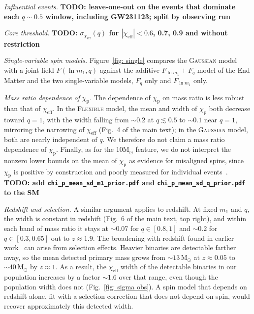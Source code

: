 \documentclass[%
 onecolumn,
 amsmath,amssymb,
 aps,
 prl,
 nofootinbib,nobibnotes,
]{revtex4-2}
\newcommand{\Msun}{\ensuremath{\mathrm{M}_{\odot}}}
\newcommand{\chieff}{\ensuremath{\chi_{\mathrm{eff}}}}
\newcommand{\chip}{\ensuremath{\chi_{\mathrm{p}}}}
\newcommand{\red}[1]{{\color{Red} #1}}
\newcommand{\todo}[1]{{\color{Blue}\bf TODO: #1}}
\newcommand{\flexiblespins}{\textsc{Flexible}\xspace}
\newcommand{\gaussianspins}{\textsc{Gaussian}\xspace}
\newcommand{\featTen}{10\xspace}
\begin{document}
\textit{Influential events.} \todo{leave-one-out on the events that dominate each $q \sim 0.5$ window, including GW231123; split by observing run}

\textit{Core threshold.} \todo{$\sigma_{\chieff}(q)$ for $|\chieff| < 0.6$, 0.7, 0.9 and without restriction}

\textit{Single-variable spin models.} Figure~\ref{fig: single} compares the \gaussianspins model with a joint field $F(\ln m_1, q)$ against the additive $F_{\ln m_1} + F_q$ model of the End Matter and the two single-variable models, $F_q$ only and $F_{\ln m_1}$ only.

\textit{Mass ratio dependence of} $\chip$\textit{.} The dependence of $\chip$ on mass ratio is less robust than that of $\chieff$. In the \flexiblespins model, the mean and width of $\chip$ both decrease toward $q = 1$, with the width falling from $\sim 0.2$ at $q \lesssim 0.5$ to $\sim 0.1$ near $q = 1$, mirroring the narrowing of $\chieff$ (Fig.~4 of the main text); in the \gaussianspins model, both are nearly independent of $q$. We therefore do not claim a mass ratio dependence of $\chip$. Finally, as for the \featTen $\Msun$ feature, we do not interpret the nonzero lower bounds on the mean of $\chip$ as evidence for misaligned spins, since $\chip$ is positive by construction and poorly measured for individual events~\cite{Vitale:2022dpa, Miller:2024sui}. \todo{add \texttt{chi\_p\_mean\_sd\_m1\_prior.pdf} and \texttt{chi\_p\_mean\_sd\_q\_prior.pdf} to the SM}

\textit{Redshift and selection.} A similar argument applies to redshift. At fixed $m_1$ and $q$, the width is constant in redshift (Fig.~6 of the main text, top right), and within each band of mass ratio it stays at $\sim 0.07$ for $q \in [0.8, 1]$ and $\sim 0.2$ for $q \in [0.3, 0.65]$ out to $z \approx 1.9$. The broadening with redshift found in earlier work~\cite{Biscoveanu:2022qac} can arise from selection effects. Heavier binaries are detectable farther away, so the mean detected primary mass grows from $\sim 13\,\Msun$ at $z \approx 0.05$ to $\sim 40\,\Msun$ by $z \approx 1$. As a result, the $\chieff$ width of the detectable binaries in our population increases by a factor $\sim 1.6$ over that range, even though the population width does not \red{(Fig.~\ref{fig: sigma obs})}. A spin model that depends on redshift alone, fit with a selection correction that does not depend on spin, would recover approximately this detected width.
\end{document}
